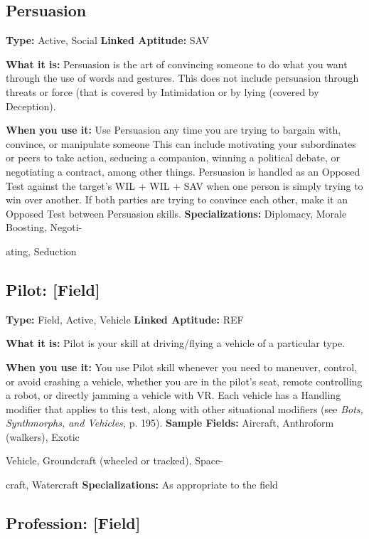 \subsection{Persuasion}

\textbf{Type:} Active, Social
\textbf{Linked Aptitude:} SAV

\textbf{What it is:} Persuasion is the art of convincing 
someone to do what you want through the use of 
words and gestures. This does not include persuasion 
through threats or force (that is covered by Intimidation
or by lying (covered by Deception).

\textbf{When you use it:} Use Persuasion any time you are 
trying to bargain with, convince, or manipulate someone
This can include motivating your subordinates or
peers to take action, seducing a companion, winning 
a political debate, or negotiating a contract, among 
other things. Persuasion is handled as an Opposed 
Test against the target's WIL + WIL + SAV when one 
person is simply trying to win over another. If both 
parties are trying to convince each other, make it an 
Opposed Test between Persuasion skills.
\textbf{Specializations:} Diplomacy, Morale Boosting, Negoti-

ating, Seduction

\subsection{Pilot: [Field]}

\textbf{Type: }Field, Active, Vehicle
\textbf{Linked Aptitude:} REF

\textbf{What it is:} Pilot is your skill at driving/flying a vehicle
of a particular type.

\textbf{When you use it:} You use Pilot skill whenever you 
need to maneuver, control, or avoid crashing a vehicle, 
whether you are in the pilot's seat, remote controlling 
a robot, or directly jamming a vehicle with VR. Each 
vehicle has a Handling modifier that applies to this 
test, along with other situational modifiers (see \textit{Bots, }
\textit{Synthmorphs, and Vehicles,} p. 195).
\textbf{Sample Fields:} Aircraft, Anthroform (walkers), Exotic 

Vehicle, Groundcraft (wheeled or tracked), Space-

craft, Watercraft
\textbf{Specializations:} As appropriate to the field

\subsection{Profession: [Field]}

